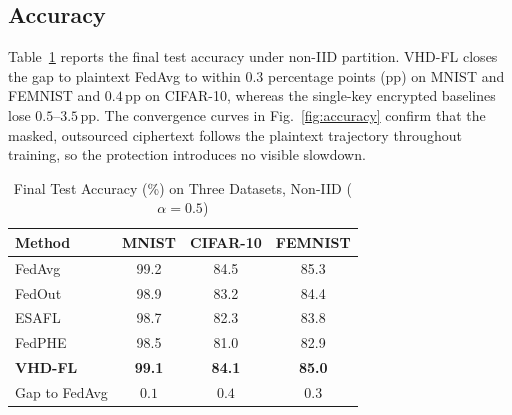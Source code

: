 \subsection{Accuracy}
\label{subsec:accuracy}
Table~\ref{tab:accuracy} reports the final test accuracy under non-IID partition. \textsc{VHD-FL} closes the gap to plaintext FedAvg to within $0.3$ percentage points (pp) on MNIST and FEMNIST and $0.4$\,pp on CIFAR-10, whereas the single-key encrypted baselines lose $0.5$--$3.5$\,pp. The convergence curves in Fig.~\ref{fig:accuracy} confirm that the masked, outsourced ciphertext follows the plaintext trajectory throughout training, so the protection introduces no visible slowdown.

\begin{table}[t]
\centering
\caption{Final Test Accuracy (\%) on Three Datasets, Non-IID ($\alpha=0.5$)}
\label{tab:accuracy}
\footnotesize
\setlength{\tabcolsep}{4pt}
\renewcommand{\arraystretch}{1.15}
\begin{tabular}{@{}lccc@{}}
\toprule
Method & MNIST & CIFAR-10 & FEMNIST \\
\midrule
FedAvg  & 99.2 & 84.5 & 85.3 \\
FedOut  & 98.9 & 83.2 & 84.4 \\
ESAFL   & 98.7 & 82.3 & 83.8 \\
FedPHE  & 98.5 & 81.0 & 82.9 \\
\textbf{VHD-FL} & \textbf{99.1} & \textbf{84.1} & \textbf{85.0} \\
\midrule
Gap to FedAvg & $0.1$ & $0.4$ & $0.3$ \\
\bottomrule
\end{tabular}
\end{table}

